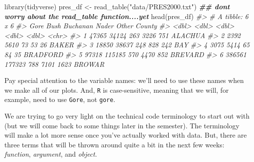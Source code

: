\documentclass[
]{book}
\newenvironment{Shaded}{\begin{snugshade}}{\end{snugshade}}
\newcommand{\CommentTok}[1]{\textcolor[rgb]{0.56,0.35,0.01}{\textit{#1}}}
\newcommand{\DocumentationTok}[1]{\textcolor[rgb]{0.56,0.35,0.01}{\textbf{\textit{#1}}}}
\newcommand{\FunctionTok}[1]{\textcolor[rgb]{0.00,0.00,0.00}{#1}}
\newcommand{\NormalTok}[1]{#1}
\newcommand{\OtherTok}[1]{\textcolor[rgb]{0.56,0.35,0.01}{#1}}
\newcommand{\StringTok}[1]{\textcolor[rgb]{0.31,0.60,0.02}{#1}}
\begin{document}
\begin{Shaded}
\begin{Highlighting}[]
\FunctionTok{library}\NormalTok{(tidyverse)}
\NormalTok{pres\_df }\OtherTok{\textless{}{-}} \FunctionTok{read\_table}\NormalTok{(}\StringTok{"data/PRES2000.txt"}\NormalTok{) }
\DocumentationTok{\#\# don\textquotesingle{}t worry about the \textasciigrave{}read\_table\textasciigrave{} function....yet}
\FunctionTok{head}\NormalTok{(pres\_df)}
\CommentTok{\#\textgreater{} \# A tibble: 6 x 6}
\CommentTok{\#\textgreater{}     Gore   Bush Buchanan Nader Other County  }
\CommentTok{\#\textgreater{}    \textless{}dbl\textgreater{}  \textless{}dbl\textgreater{}    \textless{}dbl\textgreater{} \textless{}dbl\textgreater{} \textless{}dbl\textgreater{} \textless{}chr\textgreater{}   }
\CommentTok{\#\textgreater{} 1  47365  34124      263  3226   751 ALACHUA }
\CommentTok{\#\textgreater{} 2   2392   5610       73    53    26 BAKER   }
\CommentTok{\#\textgreater{} 3  18850  38637      248   828   242 BAY     }
\CommentTok{\#\textgreater{} 4   3075   5414       65    84    35 BRADFORD}
\CommentTok{\#\textgreater{} 5  97318 115185      570  4470   852 BREVARD }
\CommentTok{\#\textgreater{} 6 386561 177323      788  7101  1623 BROWAR}
\end{Highlighting}
\end{Shaded}

Pay special attention to the variable names: we'll need to use these names when we make all of our plots. And, \texttt{R} is case-sensitive, meaning that we will, for example, need to use \texttt{Gore}, not \texttt{gore}.

We are trying to go very light on the technical code terminology to start out with (but we will come back to some things later in the semester). The terminology will make a lot more sense once you've actually worked with data. But, there are three terms that will be thrown around quite a bit in the next few weeks: \emph{function}, \emph{argument}, and \emph{object}.
\end{document}
